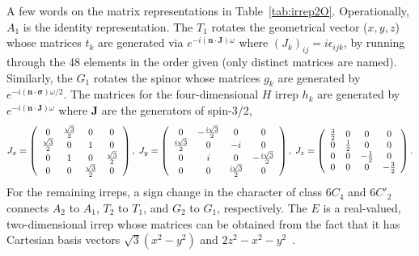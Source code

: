 \documentclass[aps,prd,reprint,showpacs,floatfix,longbibliography,,superscriptaddress]{revtex4-1}
\def\beq{\begin{equation}}
\def\eeq{\end{equation}}
\begin{document}
\begin{widetext}
A few words on the matrix representations in Table~\ref{tab:irrep2O}.
Operationally, $A_1$ is the identity representation.  The $T_1$ rotates the geometrical vector ($x, y, z$) whose matrices $t_k$ are  generated via $e^{-i(\bm n\cdot\bm J) \omega}$ where $(J_k)_{ij}=i\epsilon_{ijk}$, by running through the 48 elements in the order given (only distinct matrices are named). 
 Similarly, the $G_1$ rotates the spinor whose matrices  $g_k$ are generated by 
$e^{-i (\bm n\cdot\bm \sigma) \omega/2}$.
The matrices for the four-dimensional $H$ irrep $h_k$ are generated by $e^{-i (\bm n\cdot\bm J) \omega}$
where $\bm J$ are the generators of spin-3/2,
\beq
J_x=\left(
\begin{array}{cccc}
0                 & {\sqrt{3}\over 2} & 0                & 0                 \\
{\sqrt{3}\over 2} & 0                 & 1                & 0                 \\
0                 & 1                 & 0                & {\sqrt{3}\over 2} \\
0                 & 0                 &{\sqrt{3}\over 2} & 0 
\end{array}     
\right)           
,\;
J_y= \left(
\begin{array}{cccc}
0                 & -{i\sqrt{3}\over 2} & 0                & 0                 \\
{i\sqrt{3}\over 2} & 0                 & -i                & 0                 \\
0                 & i                 & 0                & -{i\sqrt{3}\over 2} \\
0                 & 0                 &{i\sqrt{3}\over 2} & 0
\end{array}   
\right)              
,\;
J_z= \left(
\begin{array}{cccc}
{3\over 2} & 0          & 0          & 0 \\
0          & {1\over 2} & 0          & 0 \\
0          & 0          & -{1\over 2} & 0 \\
0          & 0          &0           & -{3\over 2}
\end{array}
\right).
\eeq
For the remaining irreps, a sign change in the character of class $6C_4$ and $6C'_2$  connects $A_2$ to $A_1$,  $T_2$ to $T_1$, 
and $G_2$ to $G_1$, respectively.
The $E$ is a real-valued, two-dimensional irrep whose matrices can be obtained from the fact that 
it has Cartesian basis vectors $\sqrt{3}(x^2-y^2)$ and $2z^2-x^2-y^2$~\cite{Altmann:1994}. 

\end{widetext}
\end{document}
